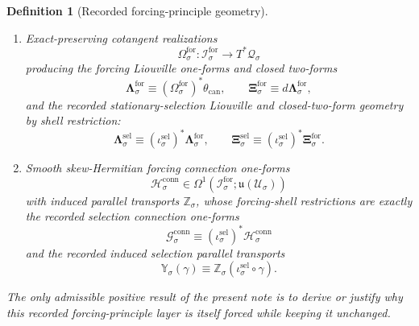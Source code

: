 \documentclass[11pt]{article}
\newcommand{\LieU}{\mathfrak u}
\newcommand{\RootClass}[1]{\mathscr U_{#1}}
\newcommand{\ConfigSpace}[1]{\mathcal Q_{#1}}
\newcommand{\ShellTarget}[1]{\mathcal E_{#1}}
\newcommand{\ConstraintTarget}[1]{\mathcal K_{#1}}
\newcommand{\OriginTarget}[1]{\mathcal H_{#1}^{\mathrm{orig}}}
\newcommand{\SelInc}[1]{\iota_{#1}^{\mathrm{sel}}}
\newcommand{\SelLiouville}[1]{\boldsymbol{\Lambda}_{#1}^{\mathrm{sel}}}
\newcommand{\SelTwo}[1]{\boldsymbol{\Xi}_{#1}^{\mathrm{sel}}}
\newcommand{\SelConnectionForm}[1]{\mathcal G_{#1}^{\mathrm{conn}}}
\newcommand{\SelTransport}[1]{\mathbb Y_{#1}}
\newcommand{\ForSpace}[1]{\mathcal I_{#1}^{\mathrm{for}}}
\newcommand{\ForLiftedAmbient}[1]{\underline{\mathfrak S}_{#1}^{\mathrm{for}}}
\newcommand{\ForLiftedShell}[1]{\underline{\mathfrak D}_{#1}^{\mathrm{for}}}
\newcommand{\ForConstraintMap}[1]{\underline{\mathfrak C}_{#1}^{\mathrm{for}}}
\newcommand{\ForCotangentRealization}[1]{\Omega_{#1}^{\mathrm{for}}}
\newcommand{\ForLiouville}[1]{\boldsymbol{\Lambda}_{#1}^{\mathrm{for}}}
\newcommand{\ForTwo}[1]{\boldsymbol{\Xi}_{#1}^{\mathrm{for}}}
\newcommand{\ForConnectionForm}[1]{\mathcal H_{#1}^{\mathrm{conn}}}
\newcommand{\ForTransport}[1]{\mathbb Z_{#1}}
\newtheorem{definition}{Definition}
\begin{document}
\begin{definition}[Recorded forcing-principle geometry]
\begin{enumerate}
    \[
    \ForLiftedAmbient{\sigma}:\ForSpace{\sigma}\to\OriginTarget{\sigma},\qquad
    \ForLiftedShell{\sigma}:\ForSpace{\sigma}\to\ShellTarget{\sigma},
    \]
    \[
    \ForConstraintMap{\sigma}:\ForSpace{\sigma}\to\ConstraintTarget{\sigma},
    \]
    whose forcing-shell restrictions are exactly the recorded selection lifted ambient-generating maps, lifted shell maps, and lifted exact-constraint maps with the same target metrics and the same recorded ambient, shell, and exact-constraint gap data.
    \item Exact-preserving cotangent realizations
    \[
    \ForCotangentRealization{\sigma}:\ForSpace{\sigma}\to T^*\ConfigSpace{\sigma}
    \]
    producing the forcing Liouville one-forms and closed two-forms
    \begin{equation}
    \ForLiouville{\sigma}\equiv (\ForCotangentRealization{\sigma})^*\theta_{\mathrm{can}},
    \qquad
    \ForTwo{\sigma}\equiv d\ForLiouville{\sigma},
    \label{eq:recorded_forcing_liouville}
    \end{equation}
    and the recorded stationary-selection Liouville and closed-two-form geometry by shell restriction:
    \[
    \SelLiouville{\sigma}\equiv (\SelInc{\sigma})^*\ForLiouville{\sigma},
    \qquad
    \SelTwo{\sigma}\equiv (\SelInc{\sigma})^*\ForTwo{\sigma}.
    \]
    \item Smooth skew-Hermitian forcing connection one-forms
    \[
    \ForConnectionForm{\sigma}\in\Omega^1(\ForSpace{\sigma};\LieU(\RootClass{\sigma}))
    \]
    with induced parallel transports \(\ForTransport{\sigma}\), whose forcing-shell restrictions are exactly the recorded selection connection one-forms
    \[
    \SelConnectionForm{\sigma}\equiv (\SelInc{\sigma})^*\ForConnectionForm{\sigma}
    \]
    and the recorded induced selection parallel transports
    \[
    \SelTransport{\sigma}(\gamma)\equiv \ForTransport{\sigma}(\SelInc{\sigma}\circ\gamma).
    \]
\end{enumerate}
The only admissible positive result of the present note is to derive or justify why this recorded forcing-principle layer is itself forced while keeping it unchanged.
\end{definition}
\end{document}
